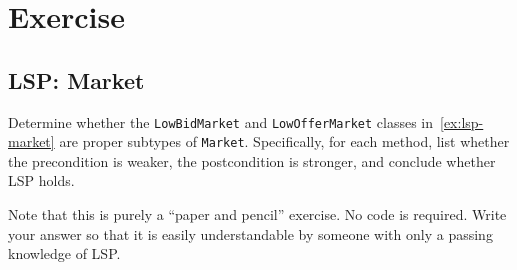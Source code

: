 \documentclass[oneside,11pt,dvipsnames]{book}
\newcommand{\code}[1]{\texttt{#1}}
\begin{document}
\section{Exercise}
\subsection{LSP: Market}\label{exercise:market}

Determine whether the \code{LowBidMarket} and \code{LowOfferMarket} classes in~\autoref{ex:lsp-market} are proper subtypes of \code{Market}. Specifically, for each method, list whether the precondition is weaker, the postcondition is stronger, and conclude whether LSP holds.

Note that this is purely a ``paper and pencil'' exercise. No code is required. Write your answer so that it is easily understandable by someone with only a passing knowledge of LSP.
\end{document}
